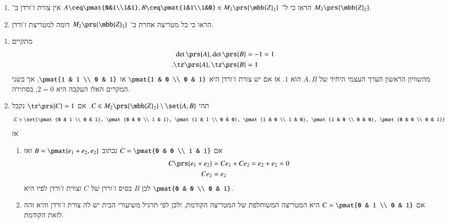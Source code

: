 \documentclass[a4paper,10pt,oneside,openany]{article}
\begin{document}
\begin{exercise}%
\begin{enumerate}
\item הראו כי ל־%
$A \ceq \pmat{0&1\\1&1}, B \ceq \pmat{1&1\\1&0} \in M_2\prs{\mbb{Z}_2}$
אין צורת ז'ורדן ב־%
$M_2\prs{\mbb{Z}_2}$.

\item הראו כי כל מטריצה אחרת ב־%
$M_2\prs{\mbb{Z}_2}$
דומה למטריצת ז'ורדן.
\end{enumerate}
\end{exercise}

\begin{solution}
\begin{enumerate}
\item
מתקיים
\begin{align*}
\det\prs{A}, \det\prs{B} &= -1 = 1 \\
\text{.} \tr\prs{A}, \tr\prs{B} &=  1
\end{align*}
מהשוויון הראשון הערך העצמי היחיד של
$A,B$
הוא
$1$.
אז אם יש צורת ז'ורדן היא
$\pmat{1 & 0 \\ 0 & 1}$
או
$\pmat{1 & 1 \\ 0 & 1}$,
אך בשני המקרים האלו העקבה היא
$2 = 0$,
בסתירה.

\item
תהי
$C \in M_2\prs{\mbb{Z}_2} \setminus \set{A,B}$.
אם
$\tr\prs{C} = 1$
נקבל
\[\text{.} C \in \set{\pmat{0 & 1 \\ 0 & 1}, \pmat{0 & 0 \\ 1 & 1}, \pmat{1 & 1 \\ 0 & 0}, \pmat{1 & 0 \\ 1 & 0}, \pmat{1 & 0 \\ 0 & 0}, \pmat{0 & 0 \\ 0 & 1}}\]
אז
\begin{enumerate}
\item אם
$C = \pmat{0 & 0 \\ 1 & 1}$
נכתוב
$B = \pmat{e_1 + e_2, e_2}$
ואז
\begin{align*}
C \prs{e_1 + e_2} &= C e_1 + C e_2 = e_2 + e_2 = 0 \\
C e_2 &= e_2
\end{align*}
לכן
$B$
בסיס ז'ורדן של
$C$
וצורת ז'ורדן לפיו היא
$\pmat{0 & 0 \\ 0 & 1}$.

\item אם
$C = \pmat{0 & 1 \\ 0 & 1}$
היא המטריצה המשוחלפת של
המטריצה הקודמת, ולכן לפי תרגיל משיעורי הבית יש לה צורת ז'ורדן והיא זהה לזאת הקודמת.


\end{enumerate}
\end{enumerate}
\end{solution}
\end{document}
